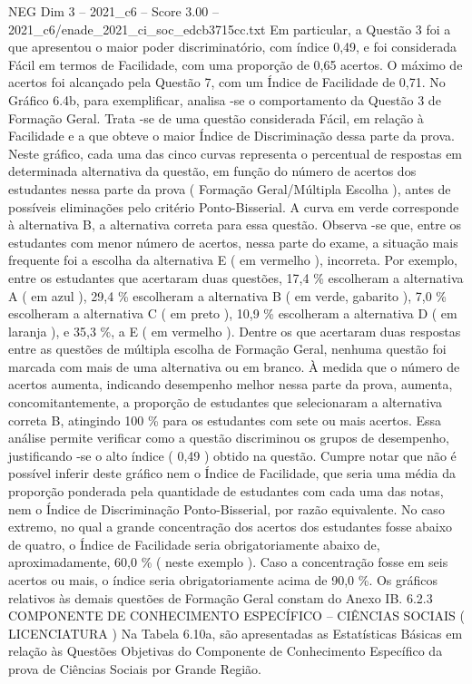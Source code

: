 \begin{textsample}{NEG Dim 3 – 2021\_c6 – Score 3.00 – 2021\_c6/enade\_2021\_ci\_soc\_edcb3715cc.txt}
Em particular, a Questão 3 foi a que apresentou o maior poder discriminatório, com índice 0,49, e foi considerada Fácil em termos de Facilidade, com uma proporção de 0,65 acertos.
O máximo de acertos foi alcançado pela Questão 7, com um Índice de Facilidade de 0,71.
No Gráfico 6.4b, para exemplificar, analisa -se o comportamento da Questão 3 de Formação Geral.
Trata -se de uma questão considerada Fácil, em relação à Facilidade e a que obteve o maior Índice de Discriminação dessa parte da prova.
Neste gráfico, cada uma das cinco curvas representa o percentual de respostas em determinada alternativa da questão, em função do número de acertos dos estudantes nessa parte da prova ( Formação Geral/Múltipla Escolha ), antes de possíveis eliminações pelo critério Ponto-Bisserial.
A curva em verde corresponde à alternativa B, a alternativa correta para essa questão.
Observa -se que, entre os estudantes com menor número de acertos, nessa parte do exame, a situação mais frequente foi a escolha da alternativa E ( em vermelho ), incorreta.
Por exemplo, entre os estudantes que acertaram duas questões, 17,4 \% escolheram a alternativa A ( em azul ), 29,4 \% escolheram a alternativa B ( em verde, gabarito ), 7,0 \% escolheram a alternativa C ( em preto ), 10,9 \% escolheram a alternativa D ( em laranja ), e 35,3 \%, a E ( em vermelho ).
Dentre os que acertaram duas respostas entre as questões de múltipla escolha de Formação Geral, nenhuma questão foi marcada com mais de uma alternativa ou em branco.
À medida que o número de acertos aumenta, indicando desempenho melhor nessa parte da prova, aumenta, concomitantemente, a proporção de estudantes que selecionaram a alternativa correta B, atingindo 100 \% para os estudantes com sete ou mais acertos.
Essa análise permite verificar como a questão discriminou os grupos de desempenho, justificando -se o alto índice ( 0,49 ) obtido na questão.
Cumpre notar que não é possível inferir deste gráfico nem o Índice de Facilidade, que seria uma média da proporção ponderada pela quantidade de estudantes com cada uma das notas, nem o Índice de Discriminação Ponto-Bisserial, por razão equivalente.
No caso extremo, no qual a grande concentração dos acertos dos estudantes fosse abaixo de quatro, o Índice de Facilidade seria obrigatoriamente abaixo de, aproximadamente, 60,0 \% ( neste exemplo ).
Caso a concentração fosse em seis acertos ou mais, o índice seria obrigatoriamente acima de 90,0 \%.
Os gráficos relativos às demais questões de Formação Geral constam do Anexo IB. 6.2.3 COMPONENTE DE CONHECIMENTO ESPECÍFICO – CIÊNCIAS SOCIAIS ( LICENCIATURA ) Na Tabela 6.10a, são apresentadas as Estatísticas Básicas em relação às Questões Objetivas do Componente de Conhecimento Específico da prova de Ciências Sociais por Grande Região.

\end{textsample}
